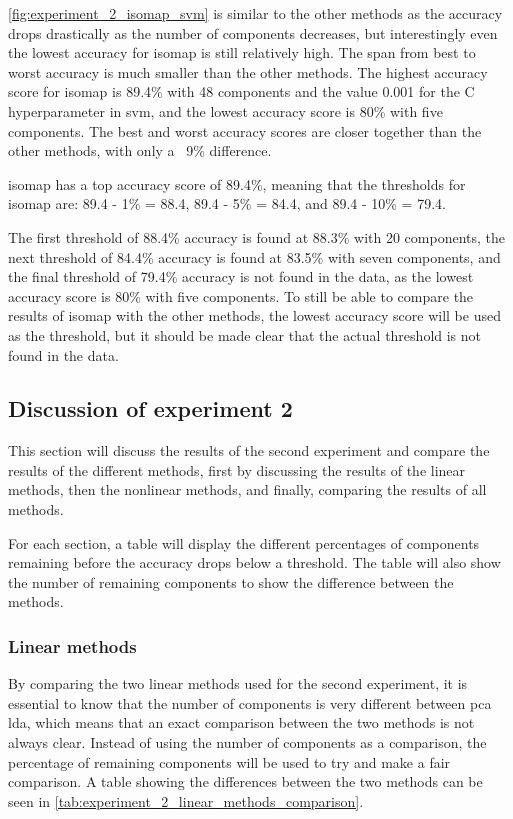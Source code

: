 \autoref{fig:experiment_2_isomap_svm} is similar to the other methods as the accuracy drops drastically as the number of components decreases, but interestingly even the lowest accuracy for \gls{isomap} is still relatively high. The span from best to worst accuracy is much smaller than the other methods. The highest accuracy score for \gls{isomap} is 89.4\% with 48 components and the value 0.001 for the C hyperparameter in \gls{svm}, and the lowest accuracy score is 80\% with five components. The best and worst accuracy scores are closer together than the other methods, with only a ~9\% difference.

isomap has a top accuracy score of 89.4\%, meaning that the thresholds for \gls{isomap}  are: 89.4 - 1\% = 88.4, 89.4 - 5\% = 84.4, and 89.4 - 10\% = 79.4.

The first threshold of 88.4\% accuracy is found at 88.3\% with 20 components, the next threshold of 84.4\% accuracy is found at 83.5\% with seven components, and the final threshold of 79.4\% accuracy is not found in the data, as the lowest accuracy score is 80\% with five components. To still be able to compare the results of \gls{isomap}  with the other methods, the lowest accuracy score will be used as the threshold, but it should be made clear that the actual threshold is not found in the data.


\subsection{Discussion of experiment 2}\label{subsec:experiment_2_discussion}
This section will discuss the results of the second experiment and compare the results of the different methods, first by discussing the results of the linear methods, then the nonlinear methods, and finally, comparing the results of all methods.

For each section, a table will display the different percentages of components remaining before the accuracy drops below a threshold. The table will also show the number of remaining components to show the difference between the methods.


\subsubsection{Linear methods}
By comparing the two linear methods used for the second experiment, it is essential to know that the number of components is very different between \gls{pca} \gls{lda}, which means that an exact comparison between the two methods is not always clear. Instead of using the number of components as a comparison, the percentage of remaining components will be used to try and make a fair comparison. A table showing the differences between the two methods can be seen in \autoref{tab:experiment_2_linear_methods_comparison}.


